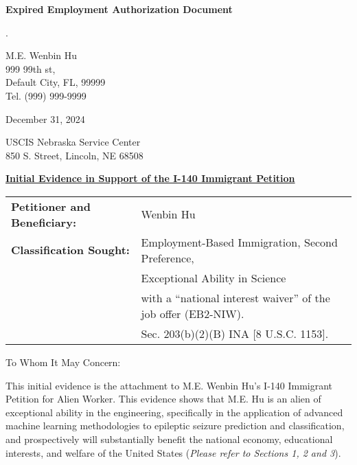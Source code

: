 \documentclass{article}
\begin{document}
% 

\vspace*{\fill}
\begin{center}

{\LARGE \bf
Expired Employment Authorization Document
}

\end{center}
\vspace*{\fill}

.

% 



\begin{flushright}
M.E. Wenbin Hu\\
999 99th st,\\
Default City, FL, 99999\\
Tel. (999) 999-9999
\end{flushright}

December 31, 2024

\label{IE}

USCIS Nebraska Service Center\\
850 S. Street, Lincoln, NE 68508

\underline{\bf Initial Evidence in Support of the I-140 Immigrant Petition}

\begin{tabular}{ll}
{\bf Petitioner and Beneficiary:} & Wenbin Hu \\
{\bf Classification Sought:} & Employment-Based Immigration, Second Preference, \\
& Exceptional Ability in Science \\
& with a “national interest waiver” of the job offer (EB2-NIW).\\
& Sec. 203(b)(2)(B) INA [8 U.S.C. 1153].
\end{tabular}
\vspace{2\baselineskip}

To Whom It May Concern:

This initial evidence is the attachment to M.E. Wenbin Hu’s I-140 Immigrant Petition for Alien Worker. This evidence shows that M.E. Hu is an alien of exceptional ability in the
engineering, specifically in the application of advanced machine learning methodologies to epileptic seizure prediction and classification, and prospectively will substantially benefit the national economy, educational interests, and welfare of the United States ({\it Please refer to Sections 1, 2 and 3}).
\end{document}
